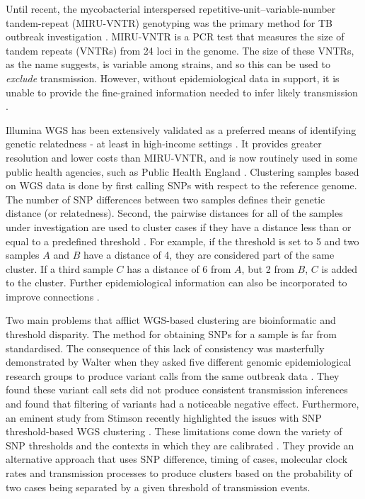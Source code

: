 Until recent, the mycobacterial interspersed repetitive-unit–variable-number tandem-repeat (MIRU-VNTR) genotyping was the primary method for TB outbreak investigation \cite{walker2013}. MIRU-VNTR is a PCR test that measures the size of tandem repeats (VNTRs) from 24 loci in the \mtb{} genome. The size of these VNTRs, as the name suggests, is variable among strains, and so this can be used to \emph{exclude} transmission. However, without epidemiological data in support, it is unable to provide the fine-grained information needed to infer likely transmission \cite{walker2013,Wyllie2018}.

Illumina WGS has been extensively validated as a preferred means of identifying \mtb{} genetic relatedness - at least in high-income settings \cite{Gardy2011,walker2013,Wyllie2018,tbmask2014,Hatherell2016}. It provides greater resolution and lower costs than MIRU-VNTR, and is now routinely used in some public health agencies, such as Public Health England \cite{Wyllie2018}. Clustering samples based on WGS data is done by first calling SNPs with respect to the \mtb{} reference genome. The number of SNP differences between two samples defines their genetic distance (or relatedness). Second, the pairwise distances for all of the samples under investigation are used to cluster cases if they have a distance less than or equal to a predefined threshold \cite{Gardy2011,walker2013}. For example, if the threshold is set to 5 and two samples $A$ and $B$ have a distance of 4, they are considered part of the same cluster. If a third sample $C$ has a distance of 6 from $A$, but 2 from $B$, $C$ is added to the cluster. Further epidemiological information can also be incorporated to improve connections \cite{Gardy2011}.

Two main problems that afflict WGS-based clustering are bioinformatic and threshold disparity. The method for obtaining SNPs for a sample is far from standardised. The consequence of this lack of consistency was masterfully demonstrated by Walter \etal{} when they asked five different genomic epidemiological research groups to produce variant calls from the same outbreak data \cite{walter2020}. They found these variant call sets did not produce consistent transmission inferences and found that filtering of variants had a noticeable negative effect. Furthermore, an eminent study from Stimson \etal{} recently highlighted the issues with SNP threshold-based WGS clustering \cite{stimson2019}. These limitations come down the variety of SNP thresholds and the contexts in which they are calibrated \cite{stimson2019}. They provide an alternative approach that uses SNP difference, timing of cases, molecular clock rates and transmission processes to produce clusters based on the probability of two cases being separated by a given threshold of transmission events.

